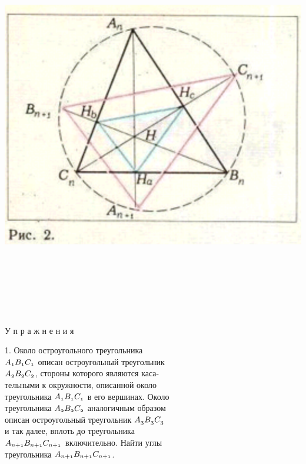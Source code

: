 \documentclass{article}
\begin{document}
\begin{multicols}{2}

\parindent0pt
\includegraphics[scale=0.4]{ris2.png}

\parindent0pt

\parindent0pt
\\
\\
\\

\parindent10pt
\\
\\
\\

\parindent15pt
У п р а ж н е н и я

\parindent15pt
1. Около  остроугольного  треугольника\\
$\mathnormal{A_{1}B_{1}C_{1}}$ описан остроугольный треугольник\\
$\mathnormal{A_{2}B_{2}C_{2}}$, стороны которого являются каса-\\
тельными к окружности, описанной около\\
треугольника $\mathnormal{A_{1}B_{1}C_{1}}$ в его вершинах. Около\\
треугольника $\mathnormal{A_{2}B_{2}C_{2}}$ аналогичным образом\\
описан остроугольный треугольник $\mathnormal{A_{3}B_{3}C_{3}}$\\
и так далее, вплоть до треугольника\\
$\mathnormal{A_{n+1}B_{n+1}C_{n+1}}$ включительно. Найти углы\\
треугольника $\mathnormal{A_{n+1}B_{n+1}C_{n+1}}$.


\end{multicols}
\end{document}
